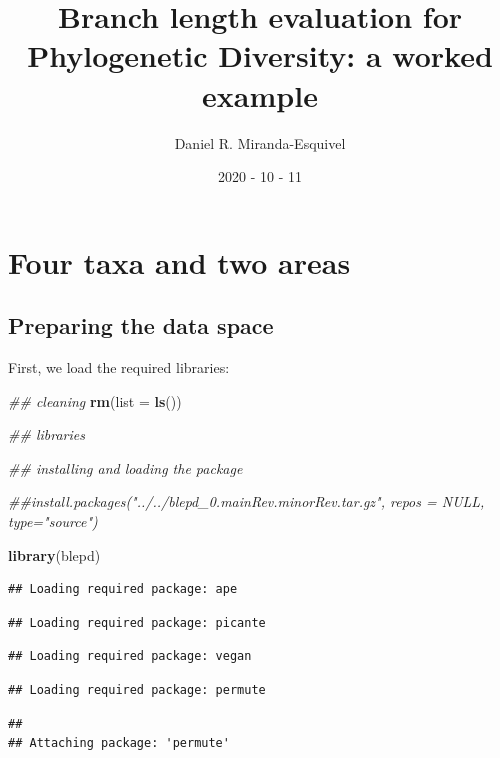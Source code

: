 \documentclass[]{article}
\title{Branch length evaluation for Phylogenetic Diversity: a worked example}
\author{Daniel R. Miranda-Esquivel}
\date{2020 - 10 - 11}
\newenvironment{Shaded}{\begin{snugshade}}{\end{snugshade}}
\newcommand{\CommentTok}[1]{\textcolor[rgb]{0.56,0.35,0.01}{\textit{#1}}}
\newcommand{\DataTypeTok}[1]{\textcolor[rgb]{0.13,0.29,0.53}{#1}}
\newcommand{\KeywordTok}[1]{\textcolor[rgb]{0.13,0.29,0.53}{\textbf{#1}}}
\newcommand{\NormalTok}[1]{#1}
\begin{document}
\maketitle

\hypertarget{four-taxa-and-two-areas}{%
\section{Four taxa and two areas}\label{four-taxa-and-two-areas}}

\hypertarget{preparing-the-data-space}{%
\subsection{Preparing the data space}\label{preparing-the-data-space}}

First, we load the required libraries:

\begin{Shaded}
\begin{Highlighting}[]
\CommentTok{## cleaning}
\KeywordTok{rm}\NormalTok{(}\DataTypeTok{list =} \KeywordTok{ls}\NormalTok{())}

\CommentTok{## libraries}

\CommentTok{## installing and loading the package}

\CommentTok{##install.packages("../../blepd_0.mainRev.minorRev.tar.gz", repos = NULL, type="source")}

\KeywordTok{library}\NormalTok{(blepd)}
\end{Highlighting}
\end{Shaded}

\begin{verbatim}
## Loading required package: ape
\end{verbatim}

\begin{verbatim}
## Loading required package: picante
\end{verbatim}

\begin{verbatim}
## Loading required package: vegan
\end{verbatim}

\begin{verbatim}
## Loading required package: permute
\end{verbatim}

\begin{verbatim}
## 
## Attaching package: 'permute'
\end{verbatim}
\end{document}
